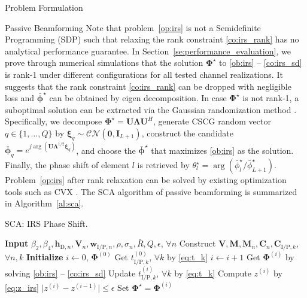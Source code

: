 \documentclass[journal]{IEEEtran}
\begin{document}
\begin{section}{Problem Formulation}
\begin{subsection}{Passive Beamforming}
			Note that problem~\eqref{op:irs} is not a Semidefinite Programming (SDP) such that relaxing the rank constraint \eqref{co:irs_rank} has no analytical performance guarantee. In Section~\ref{se:performance_evaluation}, we prove through numerical simulations that the solution $\boldsymbol{\Phi}^{\star}$ to \ref{ob:irs} -- \ref{co:irs_sd} is rank-\num{1} under different configurations for all tested channel realizations. It suggests that the rank constraint \eqref{co:irs_rank} can be dropped with negligible loss and $\bar{\boldsymbol{\phi}}^\star$ can be obtained by eigen decomposition. In case $\boldsymbol{\Phi}^{\star}$ is not rank-\num{1}, a suboptimal solution can be extracted via the Gaussian randomization method \cite{Luo2010}. Specifically, we decompose $\boldsymbol{\Phi}^{\star}=\boldsymbol{U}\boldsymbol{\Lambda}\boldsymbol{U}^H$, generate CSCG random vector $q \in \{1, \dots, Q\}$ by $\boldsymbol{\xi}_q \sim \mathcal{CN}(\boldsymbol{0},\boldsymbol{I}_{L+1})$, construct the candidate $\bar{\boldsymbol{\phi}}_q=e^{j\arg\left(\boldsymbol{U}\boldsymbol{\Lambda}^{1/2}\boldsymbol{\xi}_q\right)}$, and choose the $\bar{\boldsymbol{\phi}}^\star$ that maximizes \eqref{ob:irs} as the solution. Finally, the phase shift of element $l$ is retrieved by $\theta_l^{\star}=\arg(\bar{\phi}_l^\star/\bar{\phi}_{L+1}^\star)$. Problem~\eqref{op:irs} after rank relaxation can be solved by existing optimization tools such as CVX \cite{Grant2013}. The SCA algorithm of passive beamforming is summarized in Algorithm~\ref{al:sca}.
			\begin{algorithm}[!t]
				\caption{SCA: IRS Phase Shift.}
				\label{al:sca}
				\begin{algorithmic}[1]
					\State \textbf{Input} $\beta_2,\beta_4,\boldsymbol{h}_{\mathrm{D},n},\boldsymbol{V}_{n},\boldsymbol{w}_{\mathrm{I/P},n},\rho,\sigma_n,\bar{R},Q,\epsilon$, $\forall n$
					\State Construct $\boldsymbol{V},\boldsymbol{M},\boldsymbol{M}_n,\boldsymbol{C}_{n},\boldsymbol{C}_{\mathrm{I/P},k}$, $\forall n,k$
					\State \textbf{Initialize} $i \gets 0$, $\boldsymbol{\Phi}^{(0)}$
					\State Get $t_{\mathrm{I/P},k}^{(0)}$, $\forall k$ by \eqref{eq:t_k}
					\Repeat
						\State $i \gets i + 1$
						\State Get $\boldsymbol{\Phi}^{(i)}$ by solving \ref{ob:irs} -- \ref{co:irs_sd}
						\State Update $t_{\mathrm{I/P},k}^{(i)}$, $\forall k$ by \eqref{eq:t_k}
						\State Compute $z^{(i)}$ by \eqref{eq:z_irs}
					\Until $\lvert z^{(i)}-z^{(i-1)} \rvert \le \epsilon$
					\State Set $\boldsymbol{\Phi}^{\star}=\boldsymbol{\Phi}^{(i)}$

\end{algorithmic}
\end{algorithm}
\end{subsection}
\end{section}
\end{document}
